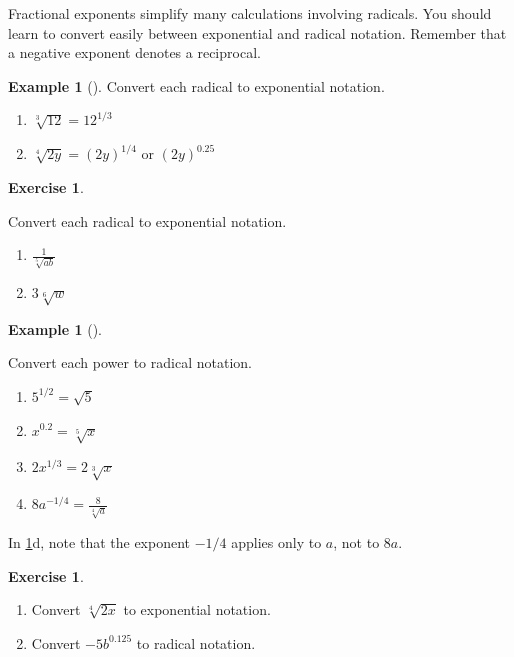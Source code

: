 \documentclass[10pt,]{book}
\theoremstyle{plain}
\theoremstyle{definition}
\theoremstyle{definition}
\theoremstyle{definition}
\newtheorem{example}[theorem]{Example}
\theoremstyle{definition}
\theoremstyle{definition}
\newtheorem{exercise}[theorem]{Exercise}
\numberwithin{equation}{section}
\begin{document}
    Fractional exponents simplify many calculations involving radicals. You should learn to convert easily between exponential and radical notation. Remember that a negative exponent denotes a reciprocal.
%
\begin{example}[]\label{example-radical-to-exponential-notation}
Convert each radical to exponential notation.
        \leavevmode%
\begin{enumerate}[label=*\alph**]
\item\hypertarget{li-483}{}\(\sqrt[3]{12} = 12^{1/3}\)\item\hypertarget{li-484}{}\(\sqrt[4]{2y} = (2y)^{1/4} \text{ or } (2y)^{0.25}\)\end{enumerate}

\end{example}
\begin{exercise}\label{exercise-radical-to-exponential-notation}

        Convert each radical to exponential notation.
        \leavevmode%
\begin{enumerate}[label=*\alph**]
\item\hypertarget{li-485}{}\(\frac{1}{\sqrt[5]{ab}}\)\item\hypertarget{li-486}{}\(3\sqrt[6]{w}\)\end{enumerate}

\end{exercise}
\begin{example}[]\label{example-exponetial-to-radical-notation}

    Convert each power to radical notation.
    \leavevmode%
\begin{enumerate}[label=*\alph**]
\item\hypertarget{li-487}{}\(5^{1/2} = \sqrt{5}\)\item\hypertarget{li-488}{}\(x^{0.2} = \sqrt[5]{x}\)\item\hypertarget{li-489}{}\(2x^{1/3} = 2 \sqrt[3]{x}\)\item\hypertarget{li-490}{}\(8a^{−1/4} = \frac{8}{\sqrt[4]{a}}\)\end{enumerate}

%
\end{example}
\par

    In \hyperref[example-exponetial-to-radical-notation]{\ref{example-exponetial-to-radical-notation}}d, note that the exponent \(−1/4\) applies only to \(a\), not to \(8a\).
%
\begin{exercise}\label{exercise-convert-exponential-radical}
\leavevmode%
\begin{enumerate}[label=*\alph**]
\item\hypertarget{li-491}{}Convert \(\sqrt[4]{2x}\) to exponential notation.\item\hypertarget{li-492}{}Convert \(−5b^{0.125}\) to radical notation.\end{enumerate}
\end{exercise}
\typeout{************************************************}
\typeout{************************************************}
\end{document}
